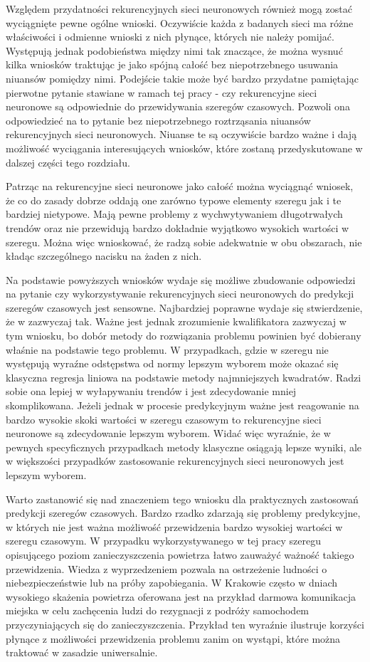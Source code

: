\documentclass[10pt,a4paper]{article}
\begin{document}
Względem przydatności rekurencyjnych sieci neuronowych również mogą zostać wyciągnięte pewne ogólne wnioski. Oczywiście każda z badanych sieci ma różne właściwości i odmienne wnioski z nich płynące, których nie należy pomijać. Występują jednak podobieństwa między nimi tak znaczące, że można wysnuć kilka wniosków traktując je jako spójną całość bez niepotrzebnego usuwania niuansów pomiędzy nimi. Podejście takie może być bardzo przydatne pamiętając pierwotne pytanie stawiane w ramach tej pracy - czy rekurencyjne sieci neuronowe są odpowiednie do przewidywania szeregów czasowych. Pozwoli ona odpowiedzieć na to pytanie bez niepotrzebnego roztrząsania niuansów rekurencyjnych sieci neuronowych. Niuanse te są oczywiście bardzo ważne i dają możliwość wyciągania interesujących wniosków, które zostaną przedyskutowane w dalszej części tego rozdziału.

Patrząc na rekurencyjne sieci neuronowe jako całość można wyciągnąć wniosek, że co do zasady dobrze oddają one zarówno typowe elementy szeregu jak i te bardziej nietypowe. Mają pewne problemy z wychwytywaniem długotrwałych trendów oraz nie przewidują bardzo dokładnie wyjątkowo wysokich wartości w szeregu. Można więc wnioskować, że radzą sobie adekwatnie w obu obszarach, nie kładąc szczególnego nacisku na żaden z nich. 

Na podstawie powyższych wniosków wydaje się możliwe zbudowanie odpowiedzi na pytanie czy wykorzystywanie rekurencyjnych sieci neuronowych do predykcji szeregów czasowych jest sensowne. Najbardziej poprawne wydaje się stwierdzenie, że w zazwyczaj tak. Ważne jest jednak zrozumienie kwalifikatora zazwyczaj w tym wniosku, bo dobór metody do rozwiązania problemu powinien być dobierany właśnie na podstawie tego problemu. W przypadkach, gdzie w szeregu nie występują wyraźne odstępstwa od normy lepszym wyborem może okazać się klasyczna regresja liniowa na podstawie metody najmniejszych kwadratów. Radzi sobie ona lepiej w wyłapywaniu trendów i jest zdecydowanie mniej skomplikowana. Jeżeli jednak w procesie predykcyjnym ważne jest reagowanie na bardzo wysokie skoki wartości w szeregu czasowym to rekurencyjne sieci neuronowe są zdecydowanie lepszym wyborem. Widać więc wyraźnie, że w pewnych specyficznych przypadkach metody klasyczne osiągają lepsze wyniki, ale w większości przypadków zastosowanie rekurencyjnych sieci neuronowych jest lepszym wyborem. 

Warto zastanowić się nad znaczeniem tego wniosku dla praktycznych zastosowań predykcji szeregów czasowych. Bardzo rzadko zdarzają się problemy predykcyjne, w których nie jest ważna możliwość przewidzenia bardzo wysokiej wartości w szeregu czasowym. W przypadku wykorzystywanego w tej pracy szeregu opisującego poziom zanieczyszczenia powietrza łatwo zauważyć ważność takiego przewidzenia. Wiedza z wyprzedzeniem pozwala na ostrzeżenie ludności o niebezpieczeństwie lub na próby zapobiegania. W Krakowie często w dniach wysokiego skażenia powietrza oferowana jest na przykład darmowa komunikacja miejska \cite{krkFreeMPK} w celu zachęcenia ludzi do rezygnacji z podróży samochodem przyczyniających się do zanieczyszczenia. Przykład ten wyraźnie ilustruje korzyści płynące z możliwości przewidzenia problemu zanim on wystąpi, które można traktować w zasadzie uniwersalnie. 
\end{document}
